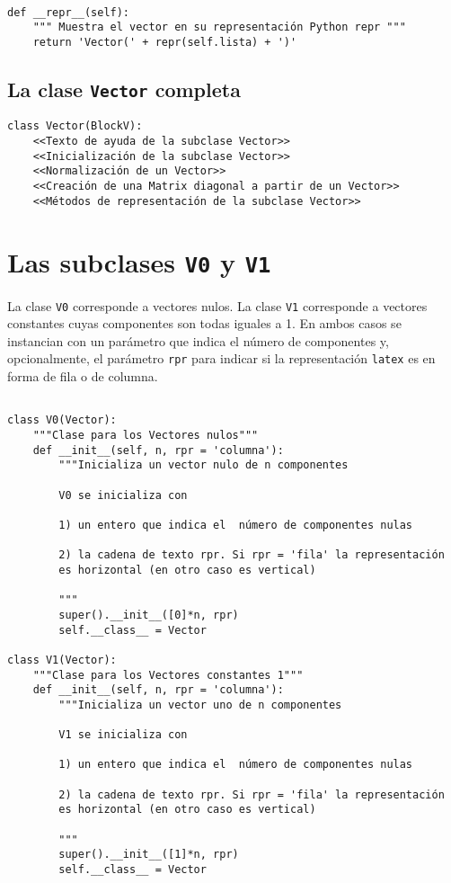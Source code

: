 \documentclass[11pt]{report}
\begin{document}
\begin{verbatim}

def __repr__(self):
    """ Muestra el vector en su representación Python repr """
    return 'Vector(' + repr(self.lista) + ')'

\end{verbatim}
\section{La clase \texttt{Vector} completa}
\label{sec:org8a415db}

\begin{verbatim}
class Vector(BlockV):
    <<Texto de ayuda de la subclase Vector>>
    <<Inicialización de la subclase Vector>>
    <<Normalización de un Vector>>
    <<Creación de una Matrix diagonal a partir de un Vector>>
    <<Métodos de representación de la subclase Vector>>
\end{verbatim}


\chapter{Las subclases \texttt{V0} y \texttt{V1}}
\label{sec:orgdc4521e}

La clase \texttt{V0} corresponde a vectores nulos. La clase \texttt{V1} corresponde
a vectores constantes cuyas componentes son todas iguales a 1. En
ambos casos se instancian con un parámetro que indica el número de
componentes y, opcionalmente, el parámetro \texttt{rpr} para indicar si la
representación \texttt{latex} es en forma de fila o de columna.

\begin{verbatim}

class V0(Vector):
    """Clase para los Vectores nulos"""
    def __init__(self, n, rpr = 'columna'):
        """Inicializa un vector nulo de n componentes

        V0 se inicializa con

        1) un entero que indica el  número de componentes nulas
    
        2) la cadena de texto rpr. Si rpr = 'fila' la representación
        es horizontal (en otro caso es vertical)

        """
        super().__init__([0]*n, rpr)
        self.__class__ = Vector

class V1(Vector):
    """Clase para los Vectores constantes 1"""
    def __init__(self, n, rpr = 'columna'):
        """Inicializa un vector uno de n componentes

        V1 se inicializa con

        1) un entero que indica el  número de componentes nulas
    
        2) la cadena de texto rpr. Si rpr = 'fila' la representación
        es horizontal (en otro caso es vertical)

        """
        super().__init__([1]*n, rpr)
        self.__class__ = Vector

\end{verbatim}
\end{document}
